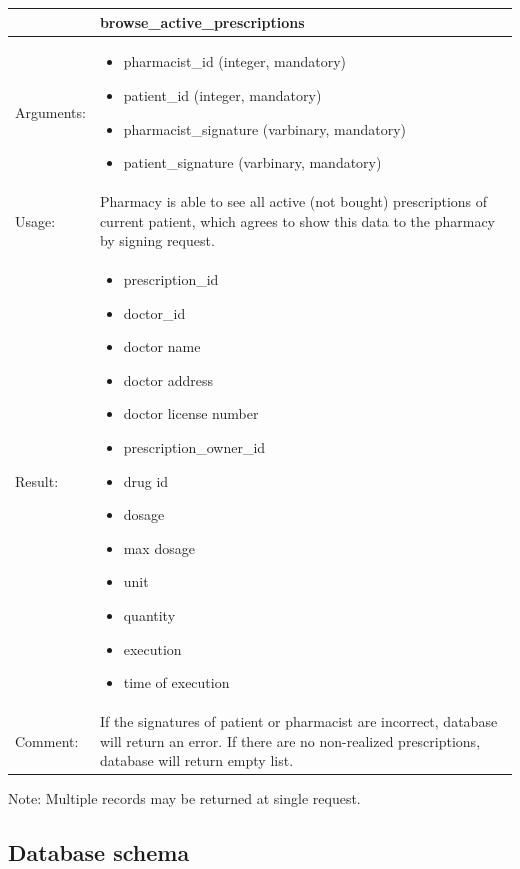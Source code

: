 \begin{table}[h]
    \begin{tabular}{| p{6cm} | p{7.75cm} |}
    \hline
     & browse\_active\_prescriptions \\ \hline
    Arguments: &  \begin{itemize}
    	\item pharmacist\_id (integer, mandatory)
		\item patient\_id (integer, mandatory)
		\item pharmacist\_signature (varbinary, mandatory)
		\item patient\_signature (varbinary, mandatory)
	\end{itemize}     \\ \hline
    Usage: & Pharmacy is able to see all active (not bought) prescriptions of current patient, which agrees to show this data to the pharmacy by signing request. \\ \hline
    Result: & \begin{itemize}
    	\item prescription\_id
    	\item doctor\_id
    	\item doctor name
    	\item doctor address
    	\item doctor license number
    	\item prescription\_owner\_id
    	\item drug id
    	\item dosage
    	\item max dosage
    	\item unit
    	\item quantity
    	\item execution
    	\item time of execution
	\end{itemize}     \\ \hline	
		Comment: & If the signatures of patient or pharmacist are incorrect, database will return an error. If there are no non-realized prescriptions, database will return empty list.\\ \hline
    \end{tabular}
\end{table}Note: Multiple records may be returned at single request.

\subsection{Database schema}

